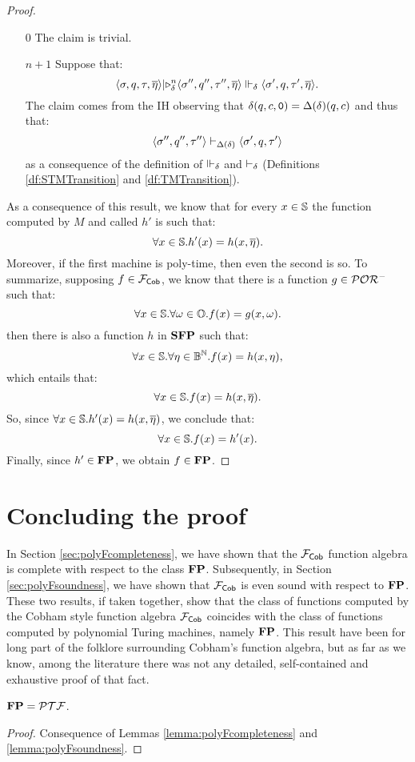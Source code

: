 \begin{proof}
\begin{itemize}
    \item [$0$] The claim is trivial.
    \item [$n+1$] Suppose that:
    $$
    \langle \sigma, q, \tau, \overline \eta\rangle \lvert\triangleright_\delta^n \langle \sigma'', q'', \tau'', \overline \eta\rangle \Vdash_\delta \langle \sigma', q, \tau', \overline \eta\rangle.
    $$
    The claim comes from the IH
    observing that $\delta(q, c, \mathtt{0}) =\Delta(\delta)(q, c)$ and thus that:
    $$
    \langle \sigma'', q'', \tau''\rangle \vdash_{\Delta(\delta)} \langle \sigma', q, \tau'\rangle
    $$
    as a consequence of the definition of $\Vdash_\delta$ and $\vdash_\delta$
    (Definitions \ref{df:STMTransition} and \ref{df:TMTransition}).
  \end{itemize}

  \noindent
  As a consequence of this result, we know that for every $x \in \mathbb{S}$
  the function computed by $M$
  and called $h'$ is such that:
  $$
  \forall x \in \mathbb{S}. h'(x) = h (x, \overline \eta).
  $$
  Moreover, if the first machine
  is poly-time, then even the second is so.
  \noindent
  To summarize, supposing $f \in \mathcal{F}_{\mathsf{Cob}}$, we know that there is a function $g \in \mathcal{POR}^-$ such that:
  $$
  \forall x\in \mathbb{S}.\forall \omega \in \mathbb{O}. f(x)=g(x, \omega).
  $$
  then there is also a function $h$ in $\mathbf{SFP}$ such that:
  $$
  \forall x\in \mathbb{S}.\forall \eta \in \mathbb{B}^{\mathbb{N}}. f(x)=h(x, \eta),
  $$
  which entails that:
  $$
  \forall x\in \mathbb{S}. f(x)=h(x,\overline \eta).
  $$
  So, since $\forall x \in \mathbb{S}. h'(x) = h (x, \overline \eta)$, we conclude that:
  $$
  \forall x\in \mathbb{S}. f(x)=h'(x).
  $$
  Finally, since $h' \in \mathbf{FP}$, we obtain $f \in \mathbf{FP}$.


\end{proof}

\section{Concluding the proof}

In Section \ref{sec:polyFcompleteness}, we have shown that the $\mathcal{F}_{\mathsf{Cob}}$ function
algebra is complete with respect to the class $\mathbf{FP}$. Subsequently, in Section
\ref{sec:polyFsoundness}, we have shown that  $\mathcal{F}_{\mathsf{Cob}}$ is even sound with respect to
$\mathbf{FP}$. These two results, if taken together, show that the class of functions computed by the
Cobham style function algebra $\mathcal{F}_{\mathsf{Cob}}$ coincides with the class of functions computed
by polynomial Turing machines, namely $\mathbf{FP}$.
%
This result have been for long part of the folklore surrounding Cobham's function
algebra, but as far as we know, among the literature there was not any detailed,
self-contained and exhaustive proof of that fact.

\begin{theorem}
  $\mathbf{FP}=\mathcal{PTF}$.
\end{theorem}
\begin{proof}
  Consequence of Lemmas
  \ref{lemma:polyFcompleteness}
  and
  \ref{lemma:polyFsoundness}.

\end{proof}
